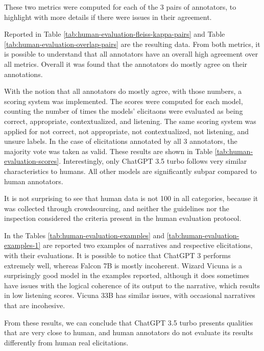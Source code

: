 
These two metrics were computed for each of the 3 pairs of annotators, to highlight with more details if there were issues in their agreement. 


Reported in Table \ref{tab:human-evaluation-fleiss-kappa-pairs} and Table \ref{tab:human-evaluation-overlap-pairs} are the resulting data. From both metrics, it is possible to understand that all annotators have an overall high agreement over all metrics.
Overall it was found that the annotators do mostly agree on their annotations.


With the notion that all annotators do mostly agree, with those numbers, a scoring system was implemented. The scores were computed for each model, counting the number of times the models' elicitaons were evaluated as being correct, appropriate, contextualized, and listening. The same scoring system was applied for not correct, not appropriate, not contextualized, not listening, and unsure labels. In the case of elicitations annotated by all 3 annotators, the majority vote was taken as valid. These results are shown in Table \ref{tab:human-evaluation-scores}.
Interestingly, only ChatGPT 3.5 turbo follows very similar characteristics to humans. All other models are significantly subpar compared to human annotators. 



It is not surprising to see that human data is not 100 in all categories, because it was collected through crowdsourcing, and neither the guidelines nor the inspection considered the criteria present in the human evaluation protocol. 

In the Tables \ref{tab:human-evaluation-examples} and \ref{tab:human-evaluation-examples-1} are reported two examples of narratives and respective elicitations, with their evaluations. It is possible to notice that ChatGPT 3 performs extremely well, whereas Falcon 7B is mostly incoherent. Wizard Vicuna is a surprisingly good model in the examples reported, although it does sometimes have issues with the logical coherence of its output to the narrative, which results in low listening scores. Vicuna 33B has similar issues, with occasional narratives that are incohesive. 

From these results, we can conclude that ChatGPT 3.5 turbo presents qualities that are very close to human, and human annotators do not evaluate its results differently from human real elicitations. 

